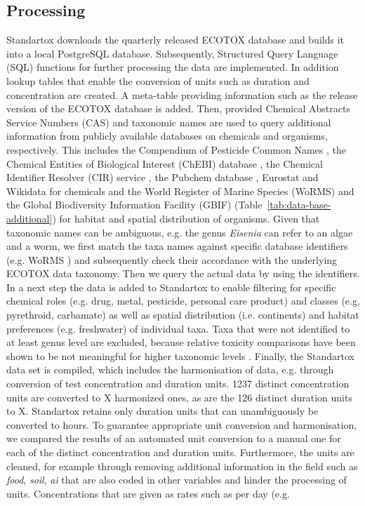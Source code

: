 \documentclass[journal,datadescriptor,accept,moreauthors,pdftex]{Definitions/mdpi}
\begin{document}
\subsection{Processing}
Standartox downloads the quarterly released ECOTOX database and builds it into a local PostgreSQL database. Subsequently, Structured Query Language (SQL) functions for further processing the data are implemented. In addition lookup tables that enable the conversion of units such as duration and concentration are created. A meta-table providing information such as the release version of the ECOTOX database is added. Then, provided Chemical Abstracts Service Numbers (CAS) and taxonomic names are used to query additional information from publicly available databases on chemicals and organisms, respectively. This includes the Compendium of Pesticide Common Names \citep{wood_compendium_2019}, the Chemical Entities of Biological Interest (ChEBI) database \citep{hastings_chebi_2016}, the Chemical Identifier Resolver (CIR) service \citep{nationalinstitutesofhealthnih_chemical_2019}, the Pubchem database \citep{kim_pubchem_2016}, Eurostat \citep{europeancommission_eurostat_2019} and Wikidata \citep{vrandecic_wikidata_2014} for chemicals and the World Register of Marine Species (WoRMS) \citep{wormseditorialboard_world_2018} and the Global Biodiversity Information Facility (GBIF) \citep{gbiftheglobalbiodiversityinformationfacility_what_2020} (Table~\ref{tab:data-base-additional}) for habitat and spatial distribution of organisms. Given that taxonomic names can be ambiguous, e.g. the genus \textit{Eisenia} can refer to an algae and a worm, we first match the taxa names against specific database identifiers (e.g. WoRMS \citep{wormseditorialboard_world_2020}) and subsequently check their accordance with the underlying ECOTOX data taxonomy. Then we query the actual data by using the identifiers. In a next step the data is added to Standartox to enable filtering for specific chemical roles (e.g. drug, metal, pesticide, personal care product) and classes (e.g. pyrethroid, carbamate) as well as spatial distribution (i.e. continents) and habitat preferences (e.g. freshwater) of individual taxa. Taxa that were not identified to at least genus level are excluded, because relative toxicity comparisons have been shown to be not meaningful for higher taxonomic levels \citep{rainbow_trace_2002, buchwalter_differences_2005, malaj_physiological_2012}. Finally, the Standartox data set is compiled, which includes the harmonisation of data, e.g. through conversion of test concentration and duration units. 1237 distinct concentration units are converted to X harmonized ones, as are the 126 distinct duration units to X. Standartox retains only duration units that can unambiguously be converted to hours. To guarantee appropriate unit conversion and harmonisation, we compared the results of an automated unit conversion to a manual one for each of the distinct concentration and duration units. Furthermore, the units are cleaned, for example through removing additional information in the field such as \textit{food}, \textit{soil}, \textit{ai} that are also coded in other variables and hinder the processing of units. Concentrations that are given as rates such as per day (e.g. 
\end{document}
